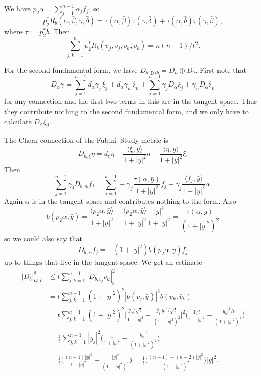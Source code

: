 \documentclass[10pt,a4paper]{amsart}
\def\<{\langle}
\def\>{\rangle}
\def\fs{b}
\def\ton{\alpha}
\def\ttw{\beta}
\def\tth{\gamma}
\def\tfo{\delta}
\begin{document}
We have $p_2 \ton = \sum_{j=1}^{n-1} \ton_j f_j$, so
$$
p_2^*R_b(\ton, \bar\ttw, \tth, \bar\tfo)
= \tau(\ton, \bar\ttw) \tau(\tth, \bar\tfo)
+ \tau(\ton, \bar\tfo) \tau(\tth, \bar\ttw),
$$
where $\tau := p_2^*b$.
Then
$$
\sum_{j,k=1}^n
p_2^*R_b(v_j, \bar v_j, v_k, \bar v_k)
= n(n-1) / t^2.
$$

For the second fundamental form, we have $D_{h \oplus t \fs} = D_h \oplus
D_{\fs}$. First note that
$$
D_\ton \tth
= \sum_{j=1}^{n-1} d_\ton \tth_j \, \xi_j + d_\ton \tth_n \, \xi_n
+ \sum_{j=1}^{n-1} \tth_j D_\ton \xi_j + \tth_n D_\ton \xi_n
$$
for any connection and the first two terms in this are in the tangent space.
Thus they contribute nothing to the second fundamental form, and we only
have to calculate $D_\ton \xi_j$.

The Chern connection of the Fubini--Study metric is
$$
D_{\fs,\xi} \eta
= d_\xi \eta
- \frac{\<\xi, \bar y\>}{1+|y|^2} \eta
- \frac{\<\eta, \bar y\>}{1+|y|^2} \xi.
$$
Then
$$
\sum_{j=1}^{n-1} \tth_j D_{\fs,\ton} f_j
= \sum_{j=1}^{n-1}
- \tth_j \frac{\tau(\ton, \bar y)}{1+|y|^2} f_j
- \tth_j \frac{\<f_j, \bar y\>}{1+|y|^2} \ton.
$$
Again $\alpha$ is in the tangent space and contributes nothing to the form.
Also
$$
b(p_2 \ton, \bar y)
= \frac{\<p_2 \ton, \bar y\>}{1+|y|^2}
- \frac{\<p_2 \ton, \bar y\>}{1+|y|^2}
\frac{|y|^2}{1+|y|^2}
= \frac{\tau(\ton, \bar y)}{(1+|y|^2)^2}
$$
so we could also say that
$$
D_{b,\ton} f_j = -(1+|y|^2) b(p_2 \ton, \bar y) f_j
$$
up to things that live in the tangent space.
We get an estimate
\begin{align*}
|D_b|^2_{Q,t}
&\leq t \sum_{j,k=1}^{n-1} |D_{b,v_j} v_k|^2_b
\\
&= t \sum_{j,k=1}^{n-1} (1+|y|^2)^2 |b(v_j, \bar y)|^2 b(v_k, \bar v_k)
\\
&= t \sum_{j,k=1}^{n-1} (1+|y|^2)^2
\biggl|
\frac{\bar y_j/\sqrt t}{1+|y|^2}
- \frac{\bar y_j |y|^2/\sqrt t}{(1+|y|^2)^2}
\biggr|^2
\biggl(
\frac{1/t}{1+|y|^2}
- \frac{|y_k|^2/t}{(1+|y|^2)^2}
\biggr)
\\
&= \frac{1}{t}
\sum_{j,k=1}^{n-1} |y_j|^2
\biggl(
\frac{1}{1+|y|^2} - \frac{|y_k|^2}{(1+|y|^2)^2}
\biggr)
\\
&= \frac 1t \biggl(
\frac{(n-1)|y|^2}{1+|y|^2} - \frac{|y|^4}{(1+|y|^2)^2}
 \biggr)
= \frac 1t \biggl(
\frac{(n-1) + (n-2)|y|^2}{(1+|y|^2)^2}
\biggr) |y|^2.
\end{align*}
\end{document}
